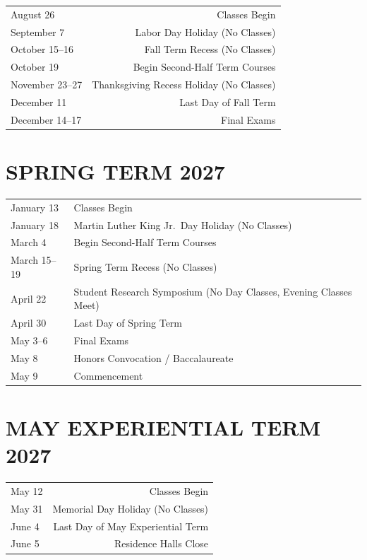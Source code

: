 \documentclass[
  letterpaper,
]{scrbook}
\renewcommand\toprule[2]\relax
\renewcommand\bottomrule[2]\relax
\newcounter{none}
\begin{document}
{\def\LTcaptype{none} %
\begin{longtable}[]{@{}lr@{}}
\toprule\noalign{}
\endhead
\bottomrule\noalign{}
\endlastfoot
August 26 & Classes Begin \\
September 7 & Labor Day Holiday (No Classes) \\
October 15--16 & Fall Term Recess (No Classes) \\
October 19 & Begin Second-Half Term Courses \\
November 23--27 & Thanksgiving Recess Holiday (No Classes) \\
December 11 & Last Day of Fall Term \\
December 14--17 & Final Exams \\
\end{longtable}
}

\section{SPRING TERM 2027}\label{spring-term-2027}

{\def\LTcaptype{none} %
\begin{longtable}[]{@{}
  >{\raggedright\arraybackslash}p{}
  >{\raggedleft\arraybackslash}p{}@{}}
\toprule\noalign{}
\endhead
\bottomrule\noalign{}
\endlastfoot
January 13 & Classes Begin \\
January 18 & Martin Luther King Jr.~Day Holiday (No Classes) \\
March 4 & Begin Second-Half Term Courses \\
March 15--19 & Spring Term Recess (No Classes) \\
April 22 & Student Research Symposium (No Day Classes, Evening Classes
Meet) \\
April 30 & Last Day of Spring Term \\
May 3--6 & Final Exams \\
May 8 & Honors Convocation / Baccalaureate \\
May 9 & Commencement \\
\end{longtable}
}

\section{MAY EXPERIENTIAL TERM 2027}\label{may-experiential-term-2027}

{\def\LTcaptype{none} %
\begin{longtable}[]{@{}lr@{}}
\toprule\noalign{}
\endhead
\bottomrule\noalign{}
\endlastfoot
May 12 & Classes Begin \\
May 31 & Memorial Day Holiday (No Classes) \\
June 4 & Last Day of May Experiential Term \\
June 5 & Residence Halls Close \\
\end{longtable}
}
\end{document}
